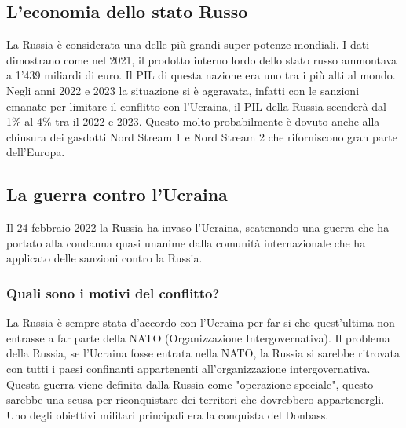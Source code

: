 \documentclass[a4paper, 12pt]{article}
\begin{document}




\subsection{L'economia dello stato Russo}

La Russia è considerata una delle più grandi super-potenze mondiali. I dati dimostrano come nel 2021, il prodotto interno lordo dello stato russo ammontava a 1'439 miliardi di euro. Il PIL di questa nazione era uno tra i più alti al mondo. Negli anni 2022 e 2023 la situazione si è aggravata, infatti con le sanzioni emanate per limitare il conflitto con l'Ucraina, il PIL della Russia scenderà dal 1\% al 4\% tra il 2022 e 2023. Questo molto probabilmente è dovuto anche alla chiusura dei gasdotti Nord Stream 1 e Nord Stream 2 che riforniscono gran parte dell'Europa.


\subsection{La guerra contro l'Ucraina}

Il 24 febbraio 2022 la Russia ha invaso l'Ucraina, scatenando una guerra che ha portato alla condanna quasi unanime dalla comunità internazionale che ha applicato delle sanzioni contro la Russia.

\subsubsection{Quali sono i motivi del conflitto?}

La Russia è sempre stata d'accordo con l'Ucraina per far si che quest'ultima non entrasse a far parte della NATO (Organizzazione Intergovernativa). Il problema della Russia, se l'Ucraina fosse entrata nella NATO, la Russia si sarebbe ritrovata con tutti i paesi confinanti appartenenti all'organizzazione intergovernativa. Questa guerra viene definita dalla Russia come "operazione speciale", questo sarebbe una scusa per riconquistare dei territori che dovrebbero appartenergli. Uno degli obiettivi militari principali era la conquista del Donbass.
\end{document}
